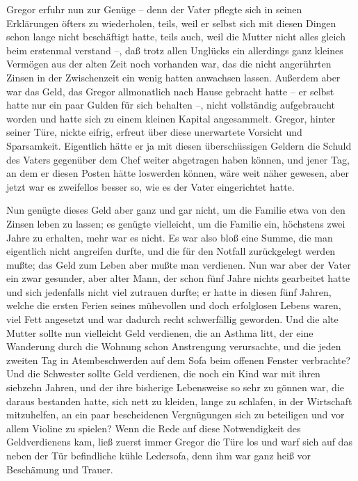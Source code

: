 Gregor erfuhr nun zur Genüge -- denn der Vater pflegte sich in seinen
Erklärungen öfters zu wiederholen, teils, weil er selbst sich mit diesen
Dingen schon lange nicht beschäftigt hatte, teils auch, weil die Mutter
nicht alles gleich beim erstenmal verstand --, daß trotz allen Unglücks
ein allerdings ganz kleines Vermögen aus der alten Zeit noch vorhanden
war, das die nicht angerührten Zinsen in der Zwischenzeit ein wenig
hatten anwachsen lassen. Außerdem aber war das Geld, das Gregor
allmonatlich nach Hause gebracht hatte -- er selbst hatte nur ein paar
Gulden für sich behalten --, nicht vollständig aufgebraucht worden und
hatte sich zu einem kleinen Kapital angesammelt. Gregor, hinter seiner
Türe, nickte eifrig, erfreut über diese unerwartete Vorsicht und
Sparsamkeit. Eigentlich hätte er ja mit diesen überschüssigen Geldern
die Schuld des Vaters gegenüber dem Chef weiter abgetragen haben können,
und jener Tag, an dem er diesen Posten hätte loswerden können, wäre weit
näher gewesen, aber jetzt war es zweifellos besser so, wie es der Vater
eingerichtet hatte.

Nun genügte dieses Geld aber ganz und gar nicht, um die Familie etwa von
den Zinsen leben zu lassen; es genügte vielleicht, um die Familie ein,
höchstens zwei Jahre zu erhalten, mehr war es nicht. Es war also bloß
eine Summe, die man eigentlich nicht angreifen durfte, und die für den
Notfall zurückgelegt werden mußte; das Geld zum Leben aber mußte man
verdienen. Nun war aber der Vater ein zwar gesunder, aber alter Mann,
der schon fünf Jahre nichts gearbeitet hatte und sich jedenfalls nicht
viel zutrauen durfte; er hatte in diesen fünf Jahren, welche die ersten
Ferien seines mühevollen und doch erfolglosen Lebens waren, viel Fett
angesetzt und war dadurch recht schwerfällig geworden. Und die alte
Mutter sollte nun vielleicht Geld verdienen, die an Asthma litt, der
eine Wanderung durch die Wohnung schon Anstrengung verursachte, und die
jeden zweiten Tag in Atembeschwerden auf dem Sofa beim offenen Fenster
verbrachte? Und die Schwester sollte Geld verdienen, die noch ein Kind
war mit ihren siebzehn Jahren, und der ihre bisherige Lebensweise so
sehr zu gönnen war, die daraus bestanden hatte, sich nett zu kleiden,
lange zu schlafen, in der Wirtschaft mitzuhelfen, an ein paar
bescheidenen Vergnügungen sich zu beteiligen und vor allem Violine zu
spielen? Wenn die Rede auf diese Notwendigkeit des Geldverdienens kam,
ließ zuerst immer Gregor die Türe los und warf sich auf das neben der
Tür befindliche kühle Ledersofa, denn ihm war ganz heiß vor Beschämung
und Trauer.

